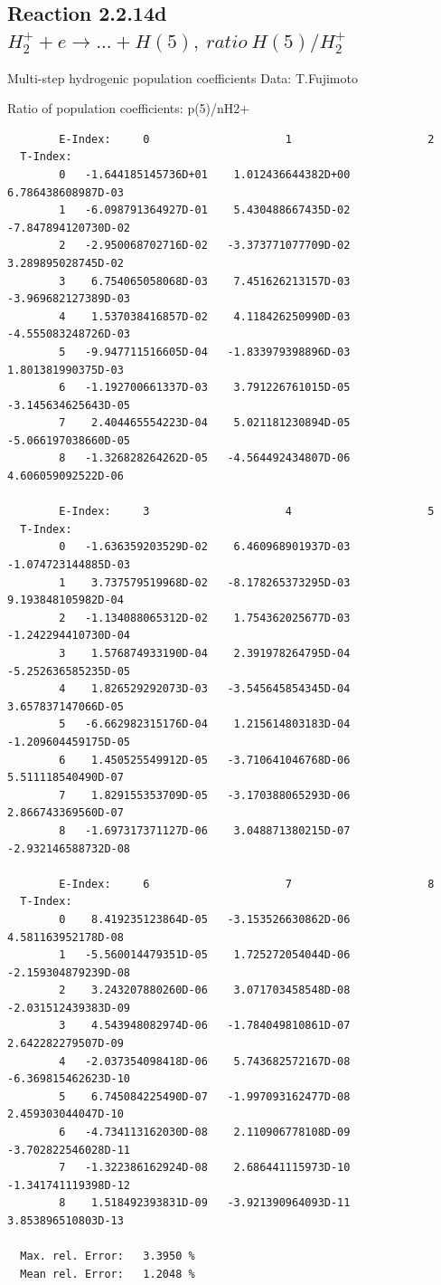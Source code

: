\documentclass[12pt,dvips]{article}
\begin{document}
\subsection{
Reaction 2.2.14d $ H_2^+ + e \rightarrow ...+ H(5) , \   ratio ~ H(5)/H_2^+  $
}

 Multi-step hydrogenic population coefficients
 Data: T.Fujimoto

 Ratio of population coefficients: p(5)/nH2+

\begin{small}\begin{verbatim}
        E-Index:     0                     1                     2
  T-Index:
        0   -1.644185145736D+01    1.012436644382D+00    6.786438608987D-03
        1   -6.098791364927D-01    5.430488667435D-02   -7.847894120730D-02
        2   -2.950068702716D-02   -3.373771077709D-02    3.289895028745D-02
        3    6.754065058068D-03    7.451626213157D-03   -3.969682127389D-03
        4    1.537038416857D-02    4.118426250990D-03   -4.555083248726D-03
        5   -9.947711516605D-04   -1.833979398896D-03    1.801381990375D-03
        6   -1.192700661337D-03    3.791226761015D-05   -3.145634625643D-05
        7    2.404465554223D-04    5.021181230894D-05   -5.066197038660D-05
        8   -1.326828264262D-05   -4.564492434807D-06    4.606059092522D-06

        E-Index:     3                     4                     5
  T-Index:
        0   -1.636359203529D-02    6.460968901937D-03   -1.074723144885D-03
        1    3.737579519968D-02   -8.178265373295D-03    9.193848105982D-04
        2   -1.134088065312D-02    1.754362025677D-03   -1.242294410730D-04
        3    1.576874933190D-04    2.391978264795D-04   -5.252636585235D-05
        4    1.826529292073D-03   -3.545645854345D-04    3.657837147066D-05
        5   -6.662982315176D-04    1.215614803183D-04   -1.209604459175D-05
        6    1.450525549912D-05   -3.710641046768D-06    5.511118540490D-07
        7    1.829155353709D-05   -3.170388065293D-06    2.866743369560D-07
        8   -1.697317371127D-06    3.048871380215D-07   -2.932146588732D-08

        E-Index:     6                     7                     8
  T-Index:
        0    8.419235123864D-05   -3.153526630862D-06    4.581163952178D-08
        1   -5.560014479351D-05    1.725272054044D-06   -2.159304879239D-08
        2    3.243207880260D-06    3.071703458548D-08   -2.031512439383D-09
        3    4.543948082974D-06   -1.784049810861D-07    2.642282279507D-09
        4   -2.037354098418D-06    5.743682572167D-08   -6.369815462623D-10
        5    6.745084225490D-07   -1.997093162477D-08    2.459303044047D-10
        6   -4.734113162030D-08    2.110906778108D-09   -3.702822546028D-11
        7   -1.322386162924D-08    2.686441115973D-10   -1.341741119398D-12
        8    1.518492393831D-09   -3.921390964093D-11    3.853896510803D-13

  Max. rel. Error:   3.3950 %
  Mean rel. Error:   1.2048 %

\end{verbatim}\end{small}
\end{document}
